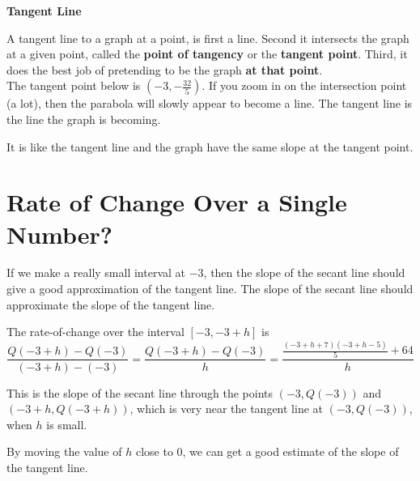 \documentclass{ximera}
\begin{document}
\begin{idea}
\textbf{\textcolor{green!50!black}{Tangent Line}}

A tangent line to a graph at a point, is first a line. Second it intersects the graph at a given point, called the \textbf{point of tangency} or the \textbf{tangent point}. Third, it does the best job of pretending to be the graph \textbf{\textcolor{red!70!darkgray}{at that point}}. \\




The tangent point below is $\left( -3, -\frac{32}{5} \right)$. If you zoom in on the intersection point (a lot), then the parabola will slowly appear to become a line. The tangent line is the line the graph is becoming. 






\begin{center}
\end{center}



It is like the tangent line and the graph have the same slope at the tangent point.

\end{idea}










\section*{Rate of Change Over a Single Number?}





If we make a really small interval at $-3$, then the slope of the secant line should give a good approximation of the tangent line.  The slope of the secant line should approximate the slope of the tangent line.




The rate-of-change over the interval $[-3, -3+h]$ is 
\[  \frac{Q(-3+h)-Q(-3)}{(-3+h)-(-3)} = \frac{Q(-3+h)-Q(-3)}{h} =  \frac{\frac{(-3+h+7)(-3+h-5)}{5}+64}{h}   \]


This is the slope of the secant line through the points $(-3, Q(-3))$ and $(-3+h, Q(-3+h))$, which is very near the tangent line at $(-3, Q(-3))$, when $h$ is small.



By moving the value of $h$ close to $0$, we can get a good estimate of the slope of the tangent line.
\end{document}
